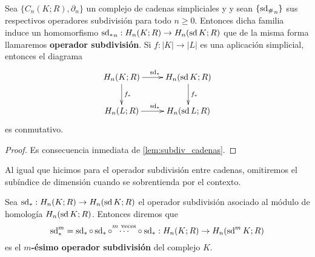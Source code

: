 \begin{proposicion}
	Sea $\{C_n(K;R), \partial_n\}$ un complejo de cadenas simpliciales y  y sean $\{{\operatorname{sd}_\#}_n\}$ sus respectivos operadores subdivisión para todo $n \geq 0$. Entonces dicha familia induce un homomorfismo ${\operatorname{sd}_*}_n: H_n(K;R) \to H_n(\operatorname{sd} K;R)$ que de la misma forma llamaremos \textbf{operador subdivisión}. Si $f: |K| \to |L|$ es una aplicación simplicial, entonces el diagrama
	\[
	\xymatrix{
		H_n(K;R) \ar@{->}[d]^{f_*} \ar@{->}[r]^{\sd_*} & H_n(\sd K;R) \ar@{->}[d]^{f_*} \\
		H_n(L;R) \ar@{->}[r]^{\sd_*} & H_n(\sd L;R)
	}
	\]
	es conmutativo.
\end{proposicion}
\begin{proof}
	Es consecuencia inmediata de \autoref{lem:subdiv_cadenas}.
\end{proof}
\begin{nota}
	Al igual que hicimos para el operador subdivisión entre cadenas, omitiremos el subíndice de dimensión cuando se sobrentienda por el contexto.
\end{nota}

\begin{definicion}
	Sea $\operatorname{sd}_*: H_n(K;R) \to H_n(\operatorname{sd} K;R)$ el operador subdivisión asociado al módulo de homología $H_n(\operatorname{sd} K;R)$. Entonces diremos que 
	\[
	\operatorname{sd}_*^m = \operatorname{sd}_* \circ \operatorname{sd}_* \circ \overset{m\ \text{veces}}{\cdots} \circ \operatorname{sd}_*: H_n(K;R) \to H_n(\operatorname{sd}^m K;R)
	\]
	es el \textbf{$m$-ésimo operador subdivisión} del complejo $K$.
\end{definicion}


